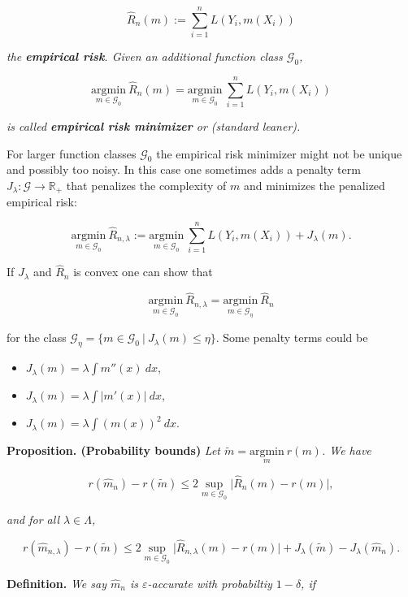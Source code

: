 \documentclass[
]{book}
\providecommand{\tightlist}{%
  \setlength{\itemsep}{0pt}\setlength{\parskip}{0pt}}
\begin{document}
\[
\hat{R}_n(m):=\sum_{i=1}^nL(Y_i,m(X_i))
\]

\emph{the \textbf{empirical risk}. Given an additional function class \(\mathcal{G}_0\),}

\[
\underset{m\in\mathcal{G}_0}{\text{argmin}}\ \hat{R}_n(m)=\underset{m\in\mathcal{G}_0}{\text{argmin}}\ \sum_{i=1}^nL(Y_i,m(X_i))
\]

\emph{is called \textbf{empirical risk minimizer} or (standard leaner).}

For larger function classes \(\mathcal{G}_0\) the empirical risk minimizer might not be unique and possibly too noisy. In this case one sometimes adds a penalty term \(J_\lambda : \mathcal{G}\to \mathbb{R}_+\) that penalizes the complexity of \(m\) and minimizes the penalized empirical risk:

\[
\underset{m\in\mathcal{G}_0}{\text{argmin}}\ \hat{R}_{n,\lambda}:=\underset{m\in\mathcal{G}_0}{\text{argmin}}\ \sum_{i=1}^nL(Y_i,m(X_i)) + J_\lambda(m).
\]

If \(J_\lambda\) and \(\hat{R}_n\) is convex one can show that

\[
\underset{m\in\mathcal{G}_0}{\text{argmin}}\ \hat{R}_{n,\lambda}=\underset{m\in\mathcal{G}_\eta}{\text{argmin}}\ \hat{R}_{n}
\]

for the class \(\mathcal{G}_\eta=\{m\in \mathcal{G}_0\ \vert\ J_\lambda(m)\le \eta\}\). Some penalty terms could be

\begin{itemize}
\tightlist
\item
  \(J_\lambda(m)=\lambda\int m''(x)\ dx\),
\item
  \(J_\lambda(m)=\lambda \int\vert m'(x)\vert\ dx\),
\item
  \(J_\lambda(m)=\lambda \int(m(x))^2\ dx\).
\end{itemize}

\textbf{Proposition. (Probability bounds)} \emph{Let \(\tilde{m}=\underset{m}{\text{argmin}}\ r(m)\). We have}

\[
r(\hat{m}_n)-r(\tilde{m})\le 2\sup_{m\in\mathcal{G}_0}\Big\vert\hat{R}_n(m) - r(m) \Big\vert,
\]

\emph{and for all \(\lambda \in \Lambda\),}

\[
r(\hat{m}_{n,\lambda})-r(\tilde{m})\le 2\sup_{m\in\mathcal{G}_0}\Big\vert\hat{R}_{n,\lambda}(m) - r(m) \Big\vert + J_\lambda(\tilde{m})-J_\lambda(\hat{m}_n).
\]

\textbf{Definition.} \emph{We say \(\hat{m}_n\) is \(\varepsilon\)-accurate with probabiltiy \(1-\delta\), if}
\end{document}
